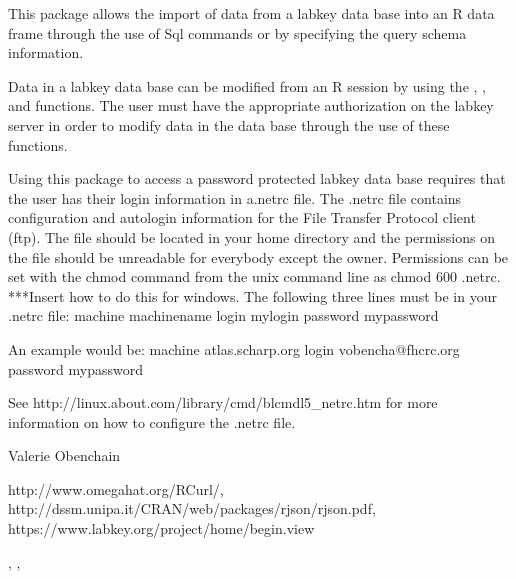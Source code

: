 \begin{Description}\relax
This package allows the import of data from a labkey data base
into an R data frame through the use of Sql
commands or by specifying the query schema information.

Data in a labkey data base can be modified from an R session
by using the , , and  functions.
The user must have the appropriate authorization on the labkey
server in order to modify data in the data base through the use of
these functions.
\end{Description}
\begin{Details}\relax
{}
Using this package to access a password protected labkey data base requires that the user
has their login information in a.netrc file. The .netrc file
contains configuration and autologin information for the File Transfer Protocol client (ftp).
The file should be located in your home directory and the permissions on the file should be unreadable for 
everybody except the owner. Permissions can be set with the chmod command from the unix command line
as chmod 600 .netrc.  ***Insert how to do this for windows.
The following three lines must be in your .netrc file:
machine machinename
login mylogin
password mypassword

An example would be:
machine atlas.scharp.org
login vobencha@fhcrc.org
password mypassword

See http://linux.about.com/library/cmd/blcmdl5_netrc.htm for more information on how to configure
the .netrc file.
\end{Details}
\begin{Author}\relax
Valerie Obenchain
\end{Author}
\begin{References}\relax
http://www.omegahat.org/RCurl/,
http://dssm.unipa.it/CRAN/web/packages/rjson/rjson.pdf,
https://www.labkey.org/project/home/begin.view
\end{References}
\begin{SeeAlso}\relax
{}, , 
\end{SeeAlso}

